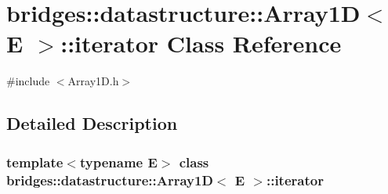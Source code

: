 \hypertarget{classbridges_1_1datastructure_1_1_array1_d_1_1iterator}{}\section{bridges\+:\+:datastructure\+:\+:Array1D$<$ E $>$\+:\+:iterator Class Reference}
\label{classbridges_1_1datastructure_1_1_array1_d_1_1iterator}


{\ttfamily \#include $<$Array1\+D.\+h$>$}



\subsection{Detailed Description}
\subsubsection*{template$<$typename E$>$\newline
class bridges\+::datastructure\+::\+Array1\+D$<$ E $>$\+::iterator}

